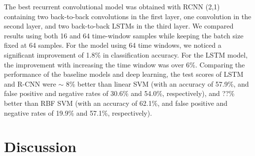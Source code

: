 \documentclass{article}
\begin{document}

The best recurrent convolutional model was obtained with RCNN (2,1) containing two back-to-back convolutions in the first layer, one convolution in the second layer, and two back-to-back LSTMs in the third layer. We compared results using both 16 and 64 time-window samples while keeping the batch size fixed at 64 samples. For the model using 64 time windows, we noticed a significant improvement of 1.8\% in classification accuracy. For the LSTM model, the improvement with increasing the time window was over 6\%. Comparing the performance of the baseline models and deep learning, the test scores of LSTM and R-CNN were $\sim$ 8\% better than linear SVM (with an accuracy of 57.9\%, and false positive and negative rates of 30.6\% and 54.0\%, respectively), and ??\% better than RBF SVM (with an accuracy of 62.1\%, and false positive and negative rates of 19.9\% and 57.1\%, respectively).

\section{Discussion}
\end{document}
